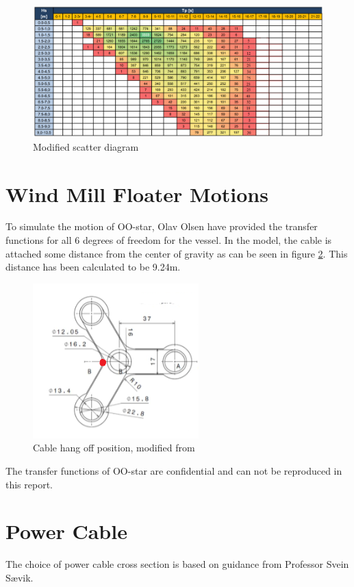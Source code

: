 \begin{figure}[H]
\centering
\includegraphics[scale=0.5]{figures/scatternew}
\caption[$\; \:$Modified scatter diagram ]{Modified scatter diagram  }
 \label{fig:scatn}
\end{figure}

\section{Wind Mill Floater Motions}
To simulate the motion of OO-star, Olav Olsen have provided the transfer functions for all 6 degrees of freedom for the vessel. In the model, the cable is attached some distance from the center of gravity as can be seen in figure \ref{fig:cabhang}. This distance has been calculated to be 9.24m.

\begin{figure}[H]
\centering
\includegraphics[scale=1.2]{figures/cabhang}
\caption[$\; \:$Cable hang off position]{Cable hang off position, modified from \cite{Lifes50+D4.2}}
 \label{fig:cabhang}
\end{figure}
 \noindent The transfer functions of OO-star are confidential and can not be reproduced in this report. 
 
\section{Power Cable}
The choice of power cable cross section is based on guidance from Professor Svein Sævik. 

